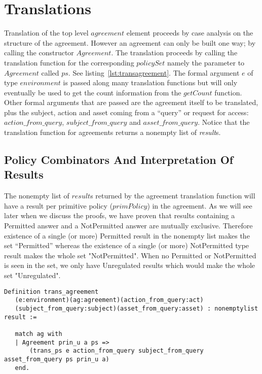 \section{Translations}


Translation of the top level $agreement$ element proceeds by case analysis on the structure of the agreement. However an agreement can only be built one way; by calling the constructor $Agreement$. The translation proceeds by calling the translation function for the corresponding $policySet$ namely the parameter to $Agreement$ called $ps$. See listing~\ref{lst:transagreement}. The formal argument $e$ of type $environment$ is passed along many translation functions but will only eventually be used to get the count information from the $getCount$ function. Other formal arguments that are passed are the agreement itself to be translated, plus the subject, action and asset coming from a ``query'' or request for access: $action\_from\_query$, $subject\_from\_query$ and $asset\_from\_query$. Notice that the translation function for agreements returns a nonempty list of \emph{result}s.

\subsection{Policy Combinators And Interpretation Of Results}\label{subsec:policycombinators}

The nonempty list of $result$s returned by the agreement translation function will have a result per primitive policy ($primPolicy$) in the agreement. As we will see later when we discuss the proofs, we have proven that results containing a Permitted answer and a NotPermitted answer are mutually exclusive. Therefore existence of a single (or more) Permitted result in the nonempty list makes the set ``Permitted'' whereas the existence of a single (or more) NotPermitted type result makes the whole set "NotPermitted". When no Permitted or NotPermitted is seen in the set, we only have Unregulated results which would make the whole set "Unregulated". 

\begin{lstlisting}
Definition trans_agreement
   (e:environment)(ag:agreement)(action_from_query:act)
   (subject_from_query:subject)(asset_from_query:asset) : nonemptylist result :=

   match ag with
   | Agreement prin_u a ps => 
       (trans_ps e action_from_query subject_from_query asset_from_query ps prin_u a)
   end.
\end{lstlisting}

